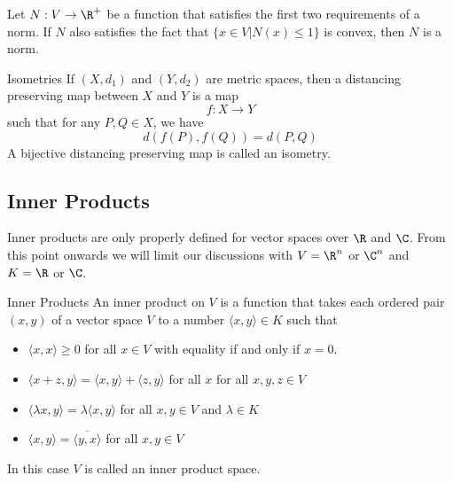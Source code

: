 \begin{prp}{}{} Let $N:V\to\R^+$ be a function that satisfies the first two requirements of a norm. If $N$ also satisfies the fact that $\{x\in V|N(x)\leq 1\}$ is convex, then $N$ is a norm. 
\end{prp}

\begin{defn}{Isometries}{} If $(X,d_1)$ and $(Y,d_2)$ are metric spaces, then a distancing preserving map between $X$ and $Y$ is a map $$f:X\to Y$$ such that for any $P,Q\in X$, we have $$d(f(P),f(Q))=d(P,Q)$$ A bijective distancing preserving map is called an isometry. 
\end{defn}


\subsection{Inner Products}
Inner products are only properly defined for vector spaces over $\R$ and $\C$. From this point onwards we will limit our discussions with $V=\R^n$ or $\C^n$ and $K=\R$ or $\C$. 
\begin{defn}{Inner Products}{} An inner product on $V$ is a function that takes each ordered pair $(x,y)$ of a vector space $V$ to a number $\langle x,y\rangle\in K$ such that 
\begin{itemize}
\item $\langle x,x\rangle\geq0$ for all $x\in V$ with equality if and only if $x=0$. 
\item $\langle x+z,y\rangle=\langle x,y\rangle+\langle z,y\rangle$ for all $x$ for all $x,y,z\in V$
\item $\langle \lambda x,y\rangle=\lambda\langle x,y\rangle$ for all $x,y\in V$ and $\lambda\in K$
\item $\langle x,y\rangle=\overline{\langle y,x\rangle}$ for all $x,y\in V$
\end{itemize}
In this case $V$ is called an inner product space. 
\end{defn}

